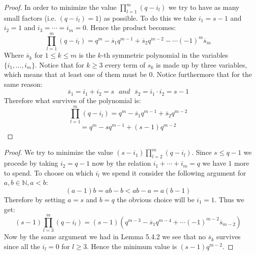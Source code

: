 \documentclass[11pt,a4paper]{report}
\theoremstyle{plain}
\theoremstyle{definition}
\begin{document}
\begin{lem-hand}[5.4.2]
\end{lem-hand}
\begin{proof}
 	In order to minimize the value $\prod\limits_{l=1}^m(q - i_l)$ we try to have as many small factors (i.e. $(q-i_l) = 1$) as possible. To do this we take $i_1 = s-1$ and $i_2 = 1$ and $i_3 = \cdots = i_m = 0$. Hence the product becomes:
 	\[
 		\prod\limits_{l=1}^m(q - i_l) = q^m - \overline{s}_1q^{m-1} + \overline{s}_2q^{m-2} - \cdots (-1)^m\overline{s}_m
 	\]
 	Where $\overline{s}_k$ for $1\le k \le m$ is the $k$-th symmetric polynomial in the variables $\{i_1,\ldots,i_m\}$. Notice that for $k \ge 3$ every term of $s_k$ is made up by three variables, which means that at least one of them must be $0$. Notice furthermore that for the same reason:
 	\[
		\overline{s}_1 = i_1 + i_2 = s\ \ \ and\ \ \ \overline{s}_2 = i_1\cdot i_2= s-1 	
 	\]
 	Therefore what survives of the polynomial is:
 		\[
 		\prod\limits_{l=1}^m(q - i_l) = q^m - \overline{s}_1q^{m-1} + \overline{s}_2q^{m-2}
 		\]
 		\[
			= q^m - sq^{m-1} + (s-1)q^{m-2} 		
 		\]
\end{proof}

\begin{lem-hand}[5.4.3]
\end{lem-hand}
\begin{proof}
	We try to minimize the value $(s-i_1)\prod\limits_{l=2}^m(q - i_l)$. Since $s \le q-1$ we procede by taking $i_2 = q-1$ now by the relation $i_1 + \cdots + i_m = q$ we have $1$ more to spend. To choose on which $i_l$ we spend it consider the following argument for $a,b \in \mathbb{N}, a<b$:
	\[
		(a-1)b = ab - b < ab - a = a(b-1)
	\]
	Therefore by setting $a = s$ and $b = q$ the obvious choice will be $i_1 = 1$. Thus we get:
	\[
		(s-1)	\prod\limits_{l=3}^m(q - i_l) = (s-1)(q^{m-3} - \overline{s}_1q^{m-4} + \cdots (-1)^{m-2}\overline{s}_{m-2})
	\]
	Now by the same argument we had in Lemma 5.4.2 we see that no $\overline{s}_k$ survives since all the $i_l =0$ for $l\ge 3$. Hence the minimum value is $(s-1)q^{m-2}$.
\end{proof}
\end{document}
